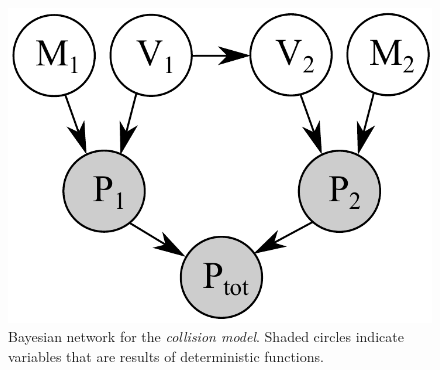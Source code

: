 \begin{figure}[t!]
\vspace{-3mm}
\begin{center}
 \includegraphics[width=0.33\linewidth]{Figs/little-momentum1.pdf} 
\end{center}
\vspace{-4mm}
\caption{\footnotesize
Bayesian network for the \emph{collision model}. 
Shaded circles indicate variables that are results of deterministic functions.} 
\label{fig:mom0}
\vspace{-2mm}
\end{figure}


